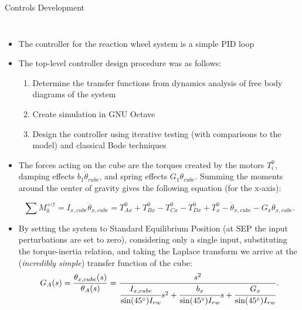 \documentclass[slidestop,compress]{beamer}
\begin{document}
\begin{frame}[plain]
\begin{block}{\vspace{0.5 cm} 

\centering Controls Development}
\begin{columns}
\begin{itemize}
\item The controller for the reaction wheel system is a simple PID loop 
\item The top-level controller design procedure was as follows:
\begin{enumerate}
\item Determine the transfer functions from dynamics analysis of free body diagrams of the system
\item Create simulation in GNU Octave
\item Design the controller using iterative testing (with comparisons to the model) and classical Bode techniques
\end{enumerate}
\item The forces acting on the cube are the torques created by the motors $T_i^0$, damping effects $b_1 \dot{\theta}_{cube}$, and spring effects $G_1 \theta_{cube}$. Summing the moments around the center of gravity gives the following equation (for the x-axis):

\[
\sum M_0^{+ \circlearrowleft} = I_{x,cube} \ddot{\theta}_{x,cube} = T^0_{Ax} + T^0_{Bx} - T^0_{Cx} - T^0_{Dx} + T^0_x - \dot{\theta}_{x,cube} - G_x \theta_{x,cube}.
\] 

\item By setting the system to Standard Equilibrium Position (at SEP the input perturbations are set to zero), considering only a single input, substituting the torque-inertia relation,  and taking the Laplace transform we arrive at the ({\emph{incredibly simple}}) transfer function of the cube:
\[G_A(s)=\frac{\theta_{x,cube}(s)}{\theta_A(s)}=\frac{s^2}{\cfrac{I_{x,cube}}{\sin(45^{\circ}) I_{rw}}s^2 + \cfrac{b_x}{\sin(45^{\circ}) I_{rw}}s + \cfrac{G_x}{\sin(45^{\circ}) I_{rw}}}.
\]
\end{itemize}
\end{columns}

\vspace{0.5 cm}
\end{block}    
\end{frame}
\end{document}
